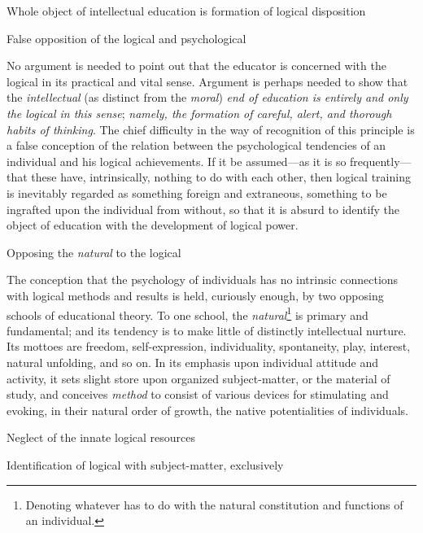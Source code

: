 \documentclass[letterpaper]{book}
\begin{document}
Whole object of intellectual education is formation of logical
disposition

False opposition of the logical and psychological

No argument is needed to point out that the educator is concerned with
the logical in its practical and vital sense. Argument is perhaps needed
to show that the \emph{intellectual} (as distinct from the \emph{moral})
\emph{end of education is entirely and only the logical in this sense};
\emph{namely,
the formation of careful, alert, and thorough habits of thinking}. The
chief difficulty in the way of recognition of this principle is a false
conception of the relation between the psychological tendencies of an
individual and his logical achievements. If it be assumed---as it is so
frequently---that these have, intrinsically, nothing to do with each
other, then logical training is inevitably regarded as something foreign
and extraneous, something to be ingrafted upon the individual from
without, so that it is absurd to identify the object of education with
the development of logical power.

Opposing the \emph{natural} to the logical

The conception that the psychology of individuals has no intrinsic
connections with logical methods and results is held, curiously enough,
by two opposing schools of educational theory. To one school, the
\emph{natural}\footnote{
Denoting whatever has to do with the natural constitution and functions
of an individual.
}
is primary and fundamental; and its tendency is to make little of
distinctly intellectual nurture. Its mottoes are freedom,
self-expression, individuality, spontaneity, play, interest, natural
unfolding, and so on. In its emphasis upon individual attitude and
activity, it sets slight store upon organized subject-matter, or the
material of study, and conceives \emph{method} to consist of various
devices for stimulating and evoking, in their natural order of growth,
the native potentialities of individuals.

Neglect of the innate logical resources

Identification of logical with subject-matter, exclusively
\end{document}
